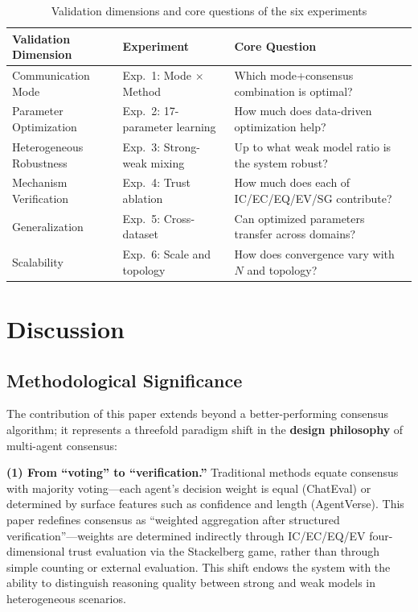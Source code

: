\documentclass[12pt,a4paper]{article}
\begin{document}
\begin{table}[H]
\centering
\caption{Validation dimensions and core questions of the six experiments}\label{tab:summary}
\begin{tabular}{lll}
\toprule
Validation Dimension & Experiment & Core Question \\
\midrule
Communication Mode & Exp.~1: Mode $\times$ Method & Which mode+consensus combination is optimal? \\
Parameter Optimization & Exp.~2: 17-parameter learning & How much does data-driven optimization help? \\
Heterogeneous Robustness & Exp.~3: Strong-weak mixing & Up to what weak model ratio is the system robust? \\
Mechanism Verification & Exp.~4: Trust ablation & How much does each of IC/EC/EQ/EV/SG contribute? \\
Generalization & Exp.~5: Cross-dataset & Can optimized parameters transfer across domains? \\
Scalability & Exp.~6: Scale and topology & How does convergence vary with $N$ and topology? \\
\bottomrule
\end{tabular}
\end{table}

\section{Discussion}\label{sec:discussion}

\subsection{Methodological Significance}

The contribution of this paper extends beyond a better-performing consensus algorithm; it represents a threefold paradigm shift in the \textbf{design philosophy} of multi-agent consensus:

\textbf{(1) From ``voting'' to ``verification.''} Traditional methods equate consensus with majority voting---each agent's decision weight is equal (ChatEval) or determined by surface features such as confidence and length (AgentVerse). This paper redefines consensus as ``weighted aggregation after structured verification''---weights are determined indirectly through IC/EC/EQ/EV four-dimensional trust evaluation via the Stackelberg game, rather than through simple counting or external evaluation. This shift endows the system with the ability to distinguish reasoning quality between strong and weak models in heterogeneous scenarios.
\end{document}
